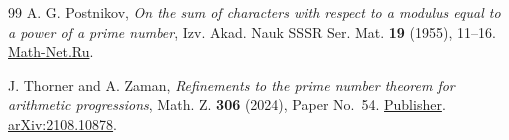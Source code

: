 \documentclass[11pt,a4paper]{article}
\theoremstyle{paperplain}
\numberwithin{equation}{section}
\begin{document}
\begin{thebibliography}{99}
A. G. Postnikov, \emph{On the sum of characters with respect to a
modulus equal to a power of a prime number}, Izv. Akad. Nauk SSSR
Ser. Mat. \textbf{19} (1955), 11--16.
\href{https://www.mathnet.ru/eng/im3519}{Math-Net.Ru}.

J. Thorner and A. Zaman,
\emph{Refinements to the prime number theorem for arithmetic progressions},
Math. Z. \textbf{306} (2024), Paper No.~54.
\href{https://doi.org/10.1007/s00209-023-03414-3}{Publisher}. \href{https://arxiv.org/abs/2108.10878v2}{arXiv:2108.10878}.

\end{thebibliography}
\end{document}
